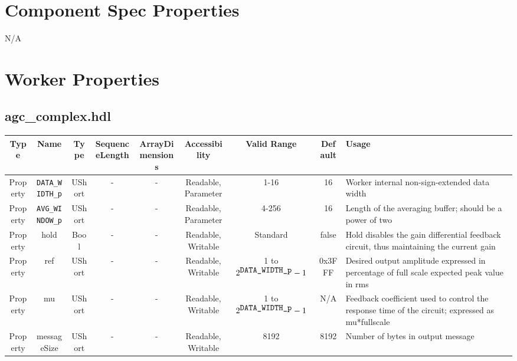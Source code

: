 \documentclass{article}
\def\comp{agc\_complex}
\begin{document}
\begin{landscape}
	\section*{Component Spec Properties}
		N/A

	\section*{Worker Properties}
	\subsection*{\comp.hdl}
	\begin{scriptsize}
		\begin{tabular}{|c|c|c|c|c|c|c|c|p{6.9cm}|}
			\hline
			\rowcolor{blue}
			Type     & Name                & Type   & SequenceLength & ArrayDimensions & Accessibility       & Valid Range & Default & Usage                                        \\
			\hline
			Property & \verb+DATA_WIDTH_p+ & UShort & -              & -               & Readable, Parameter & 1-16        & 16      & Worker internal non-sign-extended data width \\
			\hline
			Property & \verb+AVG_WINDOW_p+ & UShort & -              & -               & Readable, Parameter & 4-256       & 16      & Length of the averaging buffer; should be a power of two \\
			\hline
			Property & hold                & Bool   & -              & -               & Readable, Writable  & Standard    & false   & Hold disables the gain differential feedback circuit, thus maintaining the current gain \\
			\hline
			Property & ref                 & UShort & -              & -               & Readable, Writable  & 1 to $2^{\verb+DATA_WIDTH_p+}-1$ & 0x3FFF & Desired output amplitude expressed in percentage of full scale expected peak value in rms \\
			\hline
			Property & mu                  & UShort & -              & -               & Readable, Writable  & 1 to $2^{\verb+DATA_WIDTH_p+}-1$ & N/A & Feedback coefficient used to control the response time of the circuit; expressed as mu*fullscale \\
			\hline
			Property & messageSize         & UShort & -              & -               & Readable, Writable  & 8192        & 8192    & Number of bytes in output message                            \\
			\hline
		\end{tabular}
	\end{scriptsize}


\end{landscape}
\end{document}
